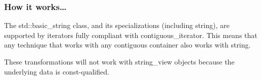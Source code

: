 \subsubsection{How it works…}

The std::basic\_string class, and its specializations (including string), are supported by iterators fully compliant with contiguous\_iterator. This means that any technique that works with any contiguous container also works with string.

\begin{tcolorbox}[colback=webgreen!5!white,colframe=webgreen!75!black,title=Note]
These transformations will not work with string\_view objects because the underlying data is const-qualified.
\end{tcolorbox}






















